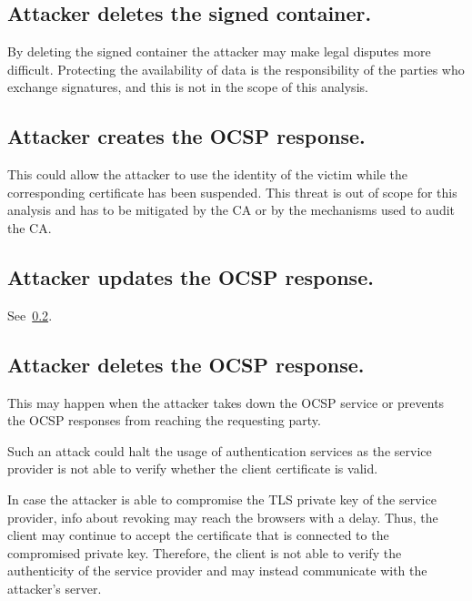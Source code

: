 \subsection{Attacker deletes the signed container.}
\label{threat:delete-signed-container}
By deleting the signed container the attacker may make legal disputes more difficult. Protecting the availability of data is the responsibility of the parties who exchange signatures, and this is not in the scope of this analysis. 



\subsection{Attacker creates the OCSP response.}
\label{threat:create-OCSP}
This could allow the attacker to use the identity of the victim while the corresponding certificate has been suspended. This threat is out of scope for this analysis and has to be mitigated by the CA or by the mechanisms used to audit the CA.


\subsection{Attacker updates the OCSP response.}
\label{threat:update-OCSP}
See~\ref{threat:create-OCSP}.

\subsection{Attacker deletes the OCSP response.}
\label{threat:delete-OCSP}
This may happen when the attacker takes down the OCSP service or prevents the OCSP responses from reaching the requesting party.

Such an attack could halt the usage of authentication services as the service provider is not able to verify whether the client certificate is valid.

In case the attacker is able to compromise the TLS private key of the service provider, info about revoking may reach the browsers with a delay. Thus, the client may continue to accept the certificate that is connected to the compromised private key. Therefore, the client is not able to verify the authenticity of the service provider and may instead communicate with the attacker's server.


